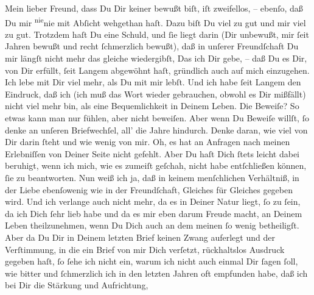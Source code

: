 \pstart
           Mein lieber Freund, dass Du Dir keiner \label{K_L03194-1v}\label{K_L03194-1h} bewußt biſt, iſt zweifellos, – ebenſo, daß Du mir \substVorne{}\textsuperscript{nie}\substDazwischen{}nie\substHinten{} mit Abſicht wehgethan haſt. Dazu biſt Du viel zu gut und mir viel zu gut.
                   Trotzdem haſt Du eine Schuld, und ſie liegt darin (Dir unbewußt, mir ſeit
               Jahren bewußt und recht ſchmerzlich bewußt), daß in unſerer Freundſchaft Du mir
               längſt nicht mehr das gleiche wiedergibſt, \introOben{}D\introOben{}as ich Dir gebe, – daß Du  es Dir, von Dir erfüllt, ſeit Langem abgewöhnt haſt,  gründlich auch auf mich einzugehen. Ich lebe mit Dir viel mehr, als Du
               mit mir lebſt. Und ich habe ſeit Langem den Eindruck, daß ich (ich muß das Wort
               wieder gebrauchen,  obwohl es Dir mißfällt) nicht viel mehr bin, als eine Bequemlichkeit in Deinem
               Leben. Die Beweiſe? So etwas kann man nur fühlen, aber nicht beweiſen. Aber wenn Du
               Beweiſe willſt, ſo denke an unſeren Briefwechſel, all’ die Jahre hindurch. Denke {\pb}daran, wie viel von Dir darin ſteht und wie wenig
               von mir. Oh, es hat an Anfragen nach meinen Erlebniſſen von Deiner Seite nicht
               gefehlt. Aber Du haſt Dich ſtets leicht dabei beruhigt, wenn ich mich, wie es zumeiſt
               geſchah, nicht habe entſchließen können, ſie zu beantworten. Nun weiß ich ja, daß in
               keinem menſchlichen Verhältniß, in der Liebe ebenſowenig wie in der Freundſchaft,
               Gleiches für Gleiches gegeben wird. Und ich verlange auch nicht mehr, da es in Deiner
               Natur liegt, ſo zu ſein, da ich Dich ſehr lieb habe und da es mir eben darum Freude
               macht, an Deinem Leben theilzunehmen, wenn Du Dich auch an dem meinen ſo wenig
               betheiligſt. Aber da Du Dir in Deinem letzten Brief keinen Zwang auferlegt und der
               Verſtimmung, in die ein Brief von mir Dich verſetzt, rückhaltslos Ausdruck gegeben
               haſt, ſo ſehe ich nicht ein, warum ich nicht auch einmal Dir ſagen ſoll, wie bitter
               und ſchmerzlich \strikeout{\textcolor{gray}{h}} ich in den letzten Jahren oft  empfunden
               habe, daß {\pb}ich bei Dir die Stärkung und Aufrichtung,
